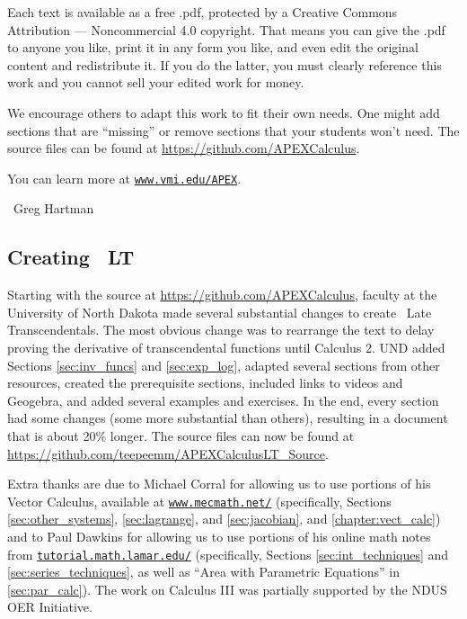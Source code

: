 \begin{itemize}
\begin{itemize}
Each text is available as a free .pdf, protected by a Creative Commons Attribution --- Noncommercial 4.0 copyright. That means you can give the .pdf to anyone you like, print it in any form you like, and even edit the original content and redistribute it. If you do the latter, you must clearly reference this work and you cannot sell your edited work for money.

We encourage others to adapt this work to fit their own needs. One might add sections that are ``missing'' or remove sections that your students won't need. The source files can be found at \url{https://github.com/APEXCalculus}.

You can learn more at \texttt{\href{http://www.vmi.edu/APEX}{www.vmi.edu/APEX}}.

~\hfill Greg Hartman

\subsection*{Creating \apex~LT}

Starting with the source at \url{https://github.com/APEXCalculus},
faculty at the University of North Dakota made several substantial changes to create \apex\ Late Transcendentals.  The most obvious change was to rearrange the text to delay proving the derivative of transcendental functions until Calculus 2.  UND added Sections \ref{sec:inv_funcs} and \ref{sec:exp_log}, adapted several sections from other resources, created the prerequisite sections, included links to videos and Geogebra, and added several examples and exercises.  In the end, every section had some changes (some more substantial than others), resulting in a document that is about 20\% longer. The source files can now be found at\iflatexml\else\\\fi
\url{https://github.com/teepeemm/APEXCalculusLT_Source}.

Extra thanks are due
to Michael Corral for allowing us to use portions of his Vector Calculus, available at \texttt{\href{http://www.mecmath.net/}{www.mecmath.net/}}
(specifically, Sections \ref{sec:other_systems}, \ref{sec:lagrange}, and \ref{sec:jacobian}, and \autoref{chapter:vect_calc})
and
to Paul Dawkins for allowing us to use portions of his online math notes from \texttt{\href{http://tutorial.math.lamar.edu/}{tutorial.math.lamar.edu/}} (specifically, Sections \ref{sec:int_techniques} and \ref{sec:series_techniques}, as well as ``Area with Parametric Equations'' in \autoref{sec:par_calc}).  The work on Calculus III was partially supported by the NDUS OER Initiative.


\end{itemize}
\end{itemize}
